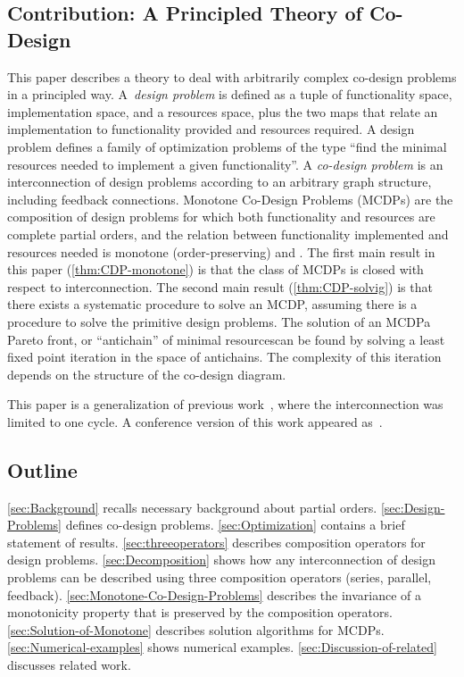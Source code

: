 \subsection{Contribution: A Principled Theory of Co-Design}

This paper describes a theory to deal with arbitrarily complex co-design
problems in a principled way. A~\emph{design problem} is defined
as a tuple of functionality space, implementation space, and a resources
space, plus the two maps that relate an implementation to functionality
provided and resources required. A design problem defines a family
of optimization problems of the type ``find the minimal resources
needed to implement a given functionality''. A \emph{co-design problem}
is an interconnection of design problems according to an arbitrary
graph structure, including feedback connections. Monotone Co-Design
Problems (MCDPs) are the composition of design problems for which
both functionality and resources are complete partial orders, and
the relation between functionality implemented and resources needed
is monotone (order-preserving) and \scottcontinuous. The first main
result in this paper (\cref{thm:CDP-monotone}) is that the
class of MCDPs is closed with respect to interconnection. The second
main result (\cref{thm:CDP-solvig}) is that there exists
a systematic procedure to solve an MCDP, assuming there is a procedure
to solve the primitive design problems. The solution of an MCDP\textemdash a
Pareto front, or ``antichain'' of minimal resources\textemdash can
be found by solving a least fixed point iteration in the space of
antichains. The complexity of this iteration depends on the structure
of the co-design diagram.

This paper is a generalization of previous work~\cite{censi15monotone},
where the interconnection was limited to one cycle. A conference
version of this work appeared as~\cite{censi15same}.

\subsection{Outline}

\cref{sec:Background} recalls necessary background about partial orders.
\cref{sec:Design-Problems} defines co-design problems. \cref{sec:Optimization}
contains a brief statement of results. \cref{sec:threeoperators} describes
composition operators for design problems. \cref{sec:Decomposition}
shows how any interconnection of design problems can be described
using three composition operators (series, parallel, feedback). \cref{sec:Monotone-Co-Design-Problems}
describes the invariance of a monotonicity property that is preserved
by the composition operators. \cref{sec:Solution-of-Monotone} describes
solution algorithms for MCDPs. \cref{sec:Numerical-examples} shows
numerical examples. \cref{sec:Discussion-of-related} discusses related
work.


